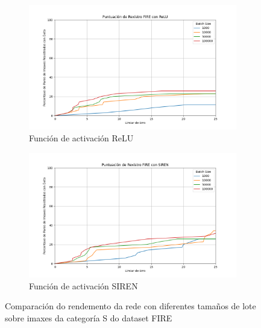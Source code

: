 \begin{figure}[tbp]
    \centering
    \begin{subfigure}[b]{0.5\textwidth}
        \centering
        \includegraphics[width=\textwidth]{imaxes/batchsize/fire_registration_scores_bs_relu_S.png}
        \caption{Función de activación ReLU}
        \label{fig:batch_size_comparison_relu}
    \end{subfigure}\hfill
    \begin{subfigure}[b]{0.5\textwidth}
        \centering
        \includegraphics[width=\textwidth]{imaxes/batchsize/fire_registration_scores_bs_siren_S.png}
        \caption{Función de activación SIREN}
        \label{fig:batch_size_comparison_siren}
    \end{subfigure}
    \caption{Comparación do rendemento da rede con diferentes tamaños de lote sobre imaxes da categoría S do dataset FIRE}
    \label{fig:batch_size_comparisons_fire}
\end{figure}



